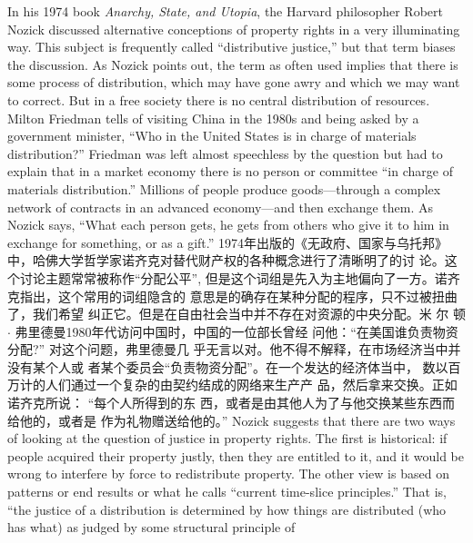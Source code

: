 \begin{paracol}{2}
In his 1974 book \textit{Anarchy, State, and Utopia}, the Harvard
philosopher Robert Nozick discussed alternative conceptions of
property rights in a very illuminating way. This subject is frequently called ``distributive justice,'' but that term biases the discussion. As Nozick points out, the term as often used implies
that there is some process of distribution, which may have gone
awry and which we may want to correct. But in a free society
there is no central distribution of resources. Milton Friedman
tells of visiting China in the 1980s and being asked by a government minister, ``Who in the United States is in charge of materials distribution?'' Friedman was left almost speechless by the
question but had to explain that in a market economy there is no
person or committee ``in charge of materials distribution.'' Millions of people produce goods---through a complex network of
contracts in an advanced economy---and then exchange them.
As Nozick says, ``What each person gets, he gets from others
who give it to him in exchange for something, or as a gift.''
\switchcolumn
1974年出版的《无政府、国家与乌托邦》中，哈佛大学哲学家诺齐克对替代财产权的各种概念进行了清晰明了的讨
论。这个讨论主题常常被称作“分配公平”, 但是这个词组是先入为主地偏向了一方。诺齐克指出，这个常用的词组隐含的
意思是的确存在某种分配的程序，只不过被扭曲了，我们希望
纠正它。但是在自由社会当中并不存在对资源的中央分配。米
尔 顿 $\cdot$ 弗里德曼1980年代访问中国时，中国的一位部长曾经
问他：“在美国谁负责物资分配?” 对这个问题，弗里德曼几
乎无言以对。他不得不解释，在市场经济当中并没有某个人或
者某个委员会“负责物资分配”。在一个发达的经济体当中，
数以百万计的人们通过一个复杂的由契约结成的网络来生产产
品，然后拿来交换。正如诺齐克所说： “每个人所得到的东
西，或者是由其他人为了与他交换某些东西而给他的，或者是
作为礼物赠送给他的。”
\switchcolumn*
Nozick suggests that there are two ways of looking at the
question of justice in property rights. The first is historical: if
people acquired their property justly, then they are entitled to
it, and it would be wrong to interfere by force to redistribute
property. The other view is based on patterns or end results or
what he calls ``current time-slice principles.'' That is, ``the justice of a distribution is determined by how things are distributed (who has what) as judged by some structural principle of

\end{paracol}
